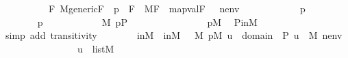 \begin{isabellebody}
\ \ \ \ \ \ \ \ \ \ {\isacharparenleft}{\kern0pt}{\isasymforall}F{\isachardot}{\kern0pt}\ M{\isacharunderscore}{\kern0pt}generic{\isacharparenleft}{\kern0pt}F{\isacharparenright}{\kern0pt}\ {\isasymand}\ p\ {\isasymin}\ F\ {\isasymlongrightarrow}\ {\isacharparenleft}{\kern0pt}M{\isacharbrackleft}{\kern0pt}F{\isacharbrackright}{\kern0pt}{\isacharcomma}{\kern0pt}\ \ map{\isacharparenleft}{\kern0pt}val{\isacharparenleft}{\kern0pt}F{\isacharparenright}{\kern0pt}{\isacharcomma}{\kern0pt}\ {\isacharbrackleft}{\kern0pt}{\isasymtheta}{\isacharbrackright}{\kern0pt}\ {\isacharat}{\kern0pt}\ nenv{\isacharat}{\kern0pt}{\isacharbrackleft}{\kern0pt}{\isasympi}{\isacharbrackright}{\kern0pt}{\isacharparenright}{\kern0pt}\ {\isasymTurnstile}\ \ {\isacharquery}{\kern0pt}{\isasymchi}{\isacharparenright}{\kern0pt}{\isacharparenright}{\kern0pt}{\isachardoublequoteclose}\ \isanewline
\ \ \ \ \ \ \ {\isasymtheta}\ p\ \isanewline
\ \ \ \ \isamarkupfalse%
\ {\isacharminus}{\kern0pt}\isanewline
\ \ \ \ \ \ \isamarkupfalse%
\ p\ {\isasymtheta}\ \isanewline
\ \ \ \ \ \ \isamarkupfalse%
\ {\isachardoublequoteopen}{\isasymtheta}\ {\isasymin}\ M{\isachardoublequoteclose}\ {\isachardoublequoteopen}p{\isasymin}P{\isachardoublequoteclose}\isanewline
\ \ \ \ \ \ \isamarkupfalse%
\ \isanewline
\ \ \ \ \ \ \isamarkupfalse%
\ {\isachardoublequoteopen}p{\isasymin}M{\isachardoublequoteclose}\ \isamarkupfalse%
\ P{\isacharunderscore}{\kern0pt}in{\isacharunderscore}{\kern0pt}M\ \isamarkupfalse%
\ {\isacharparenleft}{\kern0pt}simp\ add{\isacharcolon}{\kern0pt}\ transitivity{\isacharparenright}{\kern0pt}\isanewline
\ \ \ \ \ \ \isamarkupfalse%
\ in{\isacharunderscore}{\kern0pt}M{\isacharprime}{\kern0pt}\ {\isacharequal}{\kern0pt}\ in{\isacharunderscore}{\kern0pt}M\ {\isacartoucheopen}{\isasymtheta}\ {\isasymin}\ M{\isacartoucheclose}\ {\isacartoucheopen}p{\isasymin}M{\isacartoucheclose}\ {\isacartoucheopen}u\ {\isasymin}\ domain{\isacharparenleft}{\kern0pt}{\isasympi}{\isacharparenright}{\kern0pt}\ {\isasymtimes}\ P{\isacartoucheclose}\ {\isacartoucheopen}u\ {\isasymin}\ M{\isacartoucheclose}\ {\isacartoucheopen}nenv{\isasymin}{\isacharunderscore}{\kern0pt}{\isacartoucheclose}\isanewline
\ \ \ \ \ \ \isamarkupfalse%
\ \isanewline
\ \ \ \ \ \ \isamarkupfalse%
\ {\isachardoublequoteopen}{\isacharbrackleft}{\kern0pt}{\isasymtheta}{\isacharcomma}{\kern0pt}u{\isacharbrackright}{\kern0pt}\ {\isasymin}\ list{\isacharparenleft}{\kern0pt}M{\isacharparenright}{\kern0pt}{\isachardoublequoteclose}\ \isamarkupfalse%

\end{isabellebody}
